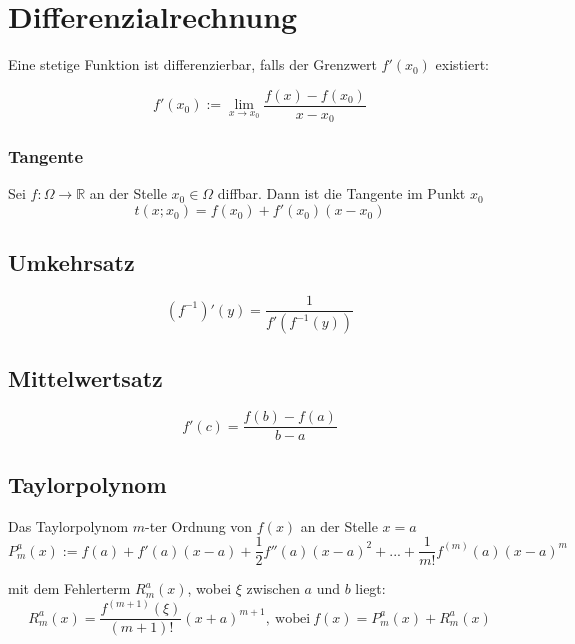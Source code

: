 
\section{Differenzialrechnung}

Eine stetige Funktion ist differenzierbar, falls der Grenzwert $f'(x_0)$ existiert:

\begin{equation*}
f'(x_0) := \lim_{x\to x_0}\frac{f(x) - f(x_0)}{x-x_0}
\end{equation*}
\subsubsection*{Tangente}
Sei $f: \Omega \to \mathbb{R}$ an der Stelle $x_0 \in \Omega$ diffbar. Dann ist die Tangente im Punkt $x_0$
\[ t(x; x_0)=f(x_0)+f'(x_0)(x-x_0) \]

\subsection{Umkehrsatz}

\begin{equation*}
(f^{-1})'(y) = \frac{1}{f'(f^{-1}(y))}
\end{equation*}

\subsection{Mittelwertsatz}

\begin{equation*}
f'(c) = \frac{f(b) - f(a)}{b - a}
\end{equation*}

\subsection{Taylorpolynom}

Das Taylorpolynom $m$-ter Ordnung von $f(x)$ an der Stelle $x=a$
\begin{equation*}
P^a_m(x) := f(a) + f'(a)(x-a) + \frac{1}{2}f''(a)(x-a)^2 + ... + \frac{1}{m!} f^{(m)}(a)(x-a)^m
\end{equation*}

mit dem Fehlerterm $R^a_m(x)$, wobei $\xi$ zwischen $a$ und $b$ liegt:
\begin{equation*}
R^a_m(x) = \frac{f^{(m+1)}(\xi)}{(m+1)!}(x+a)^{m+1},\ \text{wobei}\ f(x) = P^a_m(x) + R^a_m(x)
\end{equation*}
